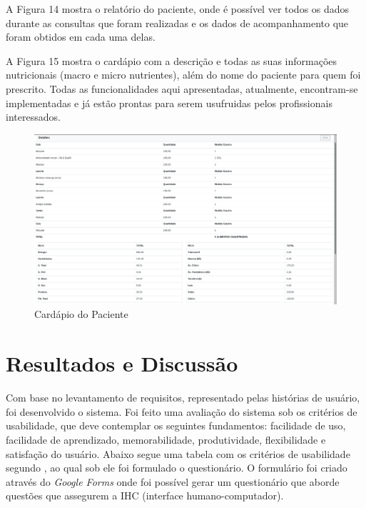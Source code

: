 \documentclass[
	12pt,				%
    oneside,			%
	a4paper,			%
	english,			%
	french,				%
	spanish,			%
	brazil,				%
	]{abntex2}
\begin{document}
A Figura 14 mostra o relatório do paciente, onde é possível ver todos os dados
durante as consultas que foram realizadas e os dados de acompanhamento que foram
obtidos em cada uma delas.

A Figura 15 mostra o cardápio com a descrição e todas as suas informações
nutricionais (macro e micro nutrientes), além do nome do paciente para quem foi
prescrito.
Todas as funcionalidades aqui apresentadas, atualmente, encontram-se
implementadas e já estão prontas para serem usufruidas pelos profissionais interessados.

\begin{figure} [hbt]
\begin{center}
\includegraphics[width=1.0\textwidth]{cardPac1.png}
\end{center}
\label{cardPac} 
\caption{Cardápio do Paciente}
\end{figure}

\chapter{Resultados e Discussão}

Com base no levantamento de requisitos, representado pelas histórias de usuário, foi desenvolvido o sistema. Foi feito uma avaliação do sistema sob os critérios de usabilidade, que deve contemplar os seguintes fundamentos: facilidade de uso, facilidade de aprendizado, memorabilidade, produtividade, flexibilidade e satisfação do usuário. Abaixo segue uma tabela com os critérios de usabilidade segundo , ao qual sob ele foi formulado o questionário.
O formulário foi criado através do \textit{Google Forms} onde foi possível gerar um questionário que aborde questões que assegurem a IHC (interface humano-computador).
\end{document}
